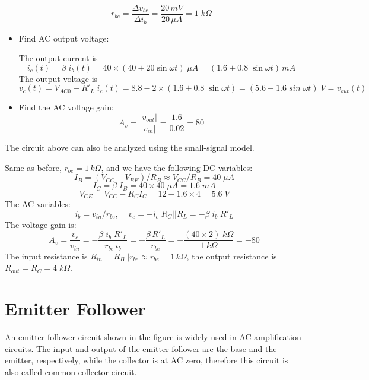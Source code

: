 \begin{itemize}
  \[
  r_{be}=\frac{\Delta v_{be}}{\Delta i_b} =\frac{20\,mV}{20\,\mu A}=1\;k\Omega
  \]

\item Find AC output voltage: 

  The output current is
  \[
  i_c(t)=\beta\; i_b(t)=40\times(40+20\sin\omega t)\;\mu A
  =(1.6+ 0.8 \;\sin\omega t)\,mA
  \]
  The output voltage is
  \[ 
  v_c(t)=V_{AC0}-R'_L\;i_c(t)=8.8-2\times(1.6+0.8\;\sin\omega t)
  =(5.6-1.6 \;sin\;\omega t)\;V=v_{out}(t)
  \]

\item Find the AC voltage gain:
  \[
  A_v=\frac{|v_{out}|}{|v_{in}|}=\frac{1.6}{0.02}=80	
\]
\end{itemize}


The circuit above can also be analyzed using the small-signal model. 


Same as before, $r_{be}=1 \,k\Omega$, and we have the following DC variables:
\[
I_B=(V_{CC}-V_{BE})/R_B \approx V_{CC}/R_B=40 \;\mu A	
\]
\[
I_C=\beta\;I_B=40\times 40\;\mu A=1.6\;mA	
\]
\[
V_{CE}=V_{CC}-R_C I_C=12-1.6\times 4=5.6\;V	
\]
The AC variables:
\[
i_b=v_{in}/r_{be}, \;\;\;\;v_c=-i_c\; R_C||R_L=-\beta\; i_b\; R'_L	
\]
The voltage gain is:
\[
A_v=\frac{v_c}{v_{in}}=-\frac{\beta\; i_b\;R'_L}{r_{be}\,i_b}
=-\frac{\beta\,R'_L}{r_{be}}=-\frac{(40\times 2)\;k\Omega}{1\;k\Omega}=-80	
\]
The input resistance is $R_{in}=R_B||r_{be}\approx r_{be}=1\,k\Omega$, the output 
resistance is $R_{out}=R_C=4\;k\Omega$.

\section*{Emitter Follower}

An emitter follower circuit shown in the figure is widely used in AC 
amplification circuits. The input and output of the emitter follower are
the base and the emitter, respectively, while the collector is at AC zero,
therefore this circuit is also called common-collector circuit.



